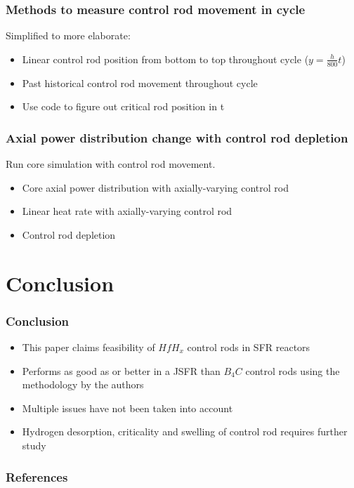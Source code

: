 \documentclass[9pt]{beamer}
\newcommand{\hfh}{$HfH_{x}$\xspace}
\newcommand{\bc}{$B_4C$\xspace}
\begin{document}
\begin{frame}
\frametitle{Methods to measure control rod movement in cycle}
Simplified to more elaborate:
\begin{itemize}
  \item Linear control rod position from bottom to top throughout cycle ($y = \frac{h}{800}t $)
  \item Past historical control rod movement throughout cycle
  \item Use code to figure out critical rod position in t
\end{itemize}
\end{frame}


\begin{frame}
\frametitle{Axial power distribution change with control rod depletion}
Run core simulation with control rod movement.
\begin{itemize}
    \item Core axial power distribution with axially-varying control rod
    \item Linear heat rate with axially-varying control rod
    \item Control rod depletion
\end{itemize}
\end{frame}

\section{Conclusion}
\begin{frame}
\frametitle{Conclusion}
\begin{itemize}
    \item This paper claims feasibility of \hfh control rods in \gls{SFR} reactors
    \item Performs as good as or better in a \gls{JSFR} than \bc control rods using the methodology by the authors
    \item Multiple issues have not been taken into account
    \item Hydrogen desorption, criticality and swelling of control rod requires further study
\end{itemize}
\end{frame}

\begin{frame}[allowframebreaks]
  \frametitle{References}
  
  {\footnotesize  }
\end{frame}
\end{document}
